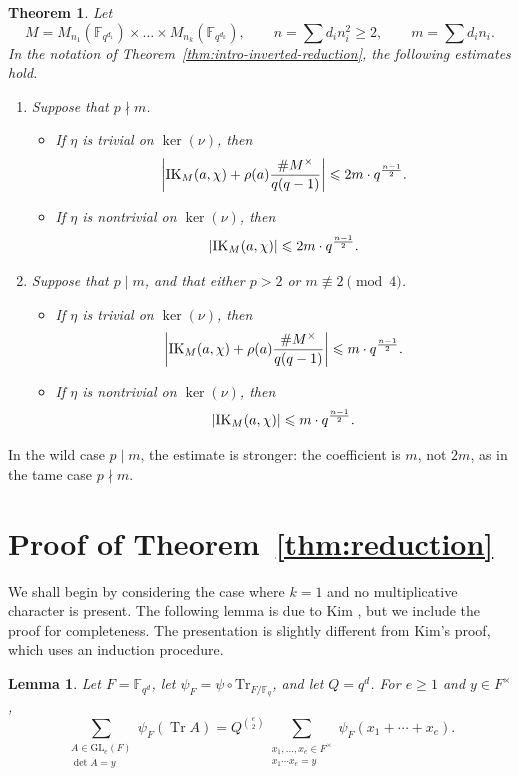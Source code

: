 \documentclass[11pt]{amsart}
\renewcommand{\leq}{\leqslant}
\renewcommand{\geq}{\geqslant}
\newcommand{\Trace}{\mathrm{Tr}}
\numberwithin{equation}{section}
\theoremstyle{remark}
\theoremstyle{plain}
\newtheorem{theorem}[equation]{Theorem}
\newtheorem{lemma}[equation]{Lemma}
\theoremstyle{definition}
\begin{document}
\begin{theorem}
Let
\[
M = M_{n_1}(\mathbb{F}_{q^{d_1}}) \times \dots \times
M_{n_k}(\mathbb{F}_{q^{d_k}}),
\qquad
n = \sum d_i n_i^2 \geq 2,
\qquad
m = \sum d_i n_i.
\]
In the notation of Theorem~\ref{thm:intro-inverted-reduction}, the
following estimates hold.
\begin{enumerate}
\item Suppose that \(p \nmid m\).
\begin{itemize}
\item If \(\eta\) is trivial on \(\ker(\nu)\), then
\[
\left| {\rm IK}_M(a, \chi) + \rho(a)\frac{\# M^\times}{q(q-1)} \right|
\leq 2m \cdot q^{\frac{n-1}{2}}.
\]
\item If \(\eta\) is nontrivial on \(\ker(\nu)\), then
\[
|{\rm IK}_M(a, \chi)| \leq 2m \cdot q^{\frac{n-1}{2}}.
\]
\end{itemize}

\item Suppose that \(p \mid m\), and that either \(p > 2\) or
\(m \not\equiv 2 \pmod 4\).
\begin{itemize}
\item If \(\eta\) is trivial on \(\ker(\nu)\), then
\[
\left| {\rm IK}_M(a, \chi) + \rho(a) \frac{\# M^\times}{q(q-1)} \right|
\leq m \cdot q^{\frac{n-1}{2}}.
\]
\item If \(\eta\) is nontrivial on \(\ker(\nu)\), then
\[
|{\rm IK}_M(a, \chi)| \leq m \cdot q^{\frac{n-1}{2}}.
\]
\end{itemize}
\end{enumerate}
\end{theorem}

In the wild case \(p \mid m\), the estimate is stronger: the
coefficient is \(m\), not \(2m\), as in the tame case \(p\nmid m\).

\section{Proof of Theorem~\ref*{thm:reduction}}

We shall begin by considering the case where \(k = 1\) and no
multiplicative character is present.  The following lemma is due to Kim
\cite{kim}, but we include the
proof for completeness.  The presentation is slightly different from
Kim's proof, which uses an induction procedure.

\begin{lemma}\label{lem:matrix-reduction}
Let \(F=\mathbb{F}_{q^d}\), let
\(\psi_F=\psi\circ\Trace_{F/\mathbb{F}_q}\), and let
\(Q=q^d\).  For \(e\geq 1\) and \(y\in F^\times\),
\begin{equation}\label{eq:matrix-reduction}
\sum_{\substack{A\in\mathrm{GL}_e(F)\\ \det A=y}}
\psi_F(\operatorname{Tr}A)
=
Q^{\binom{e}{2}}
\sum_{\substack{x_1,\ldots,x_e\in F^\times\\  x_1\cdots x_e=y}}
\psi_F(x_1+\cdots+x_e).
\end{equation}
\end{lemma}
\end{document}
